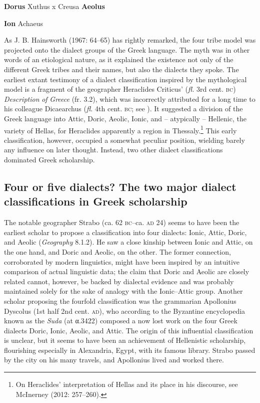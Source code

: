 \textbf{Dorus}  Xuthus x Creusa  \textbf{Aeolus}

\textbf{Ion}  Achaeus

As J. B. Hainsworth (1967: 64–65) has rightly remarked, the four tribe model was projected onto the dialect groups of the Greek language. The myth was in other words of an etiological nature, as it explained the existence not only of the different Greek tribes and their names, but also the dialects they spoke. The earliest extant testimony of a dialect classification inspired by the mythological model is a fragment of the geographer Heraclides Criticus’ (\textit{fl.} 3rd cent. \textsc{bc}) \textit{Description} \textit{of} \textit{Greece} (fr. 3.2), which was incorrectly attributed for a long time to his colleague Dicaearchus (\textit{fl.} 4th cent. \textsc{bc}; see \citealt{Brodersen2015}). It suggested a division of the Greek language into Attic, Doric, Aeolic, Ionic, and – atypically – Hellenic, the variety of Hellas, for Heraclides apparently a region in Thessaly.\footnote{On Heraclides’ interpretation of Hellas and its place in his discourse, see McInerney (2012: 257–260).} This early classification, however, occupied a somewhat peculiar position, wielding barely any influence on later thought. Instead, two other dialect classifications dominated Greek scholarship.

\subsection{Four or five dialects? The two major dialect classifications in Greek scholarship}
\hypertarget{Toc19704808}{}
The notable geographer Strabo (ca. 62 \textsc{bc–}ca. \textsc{ad} 24) seems to have been the earliest scholar to propose a classification into four dialects: Ionic, Attic, Doric, and Aeolic (\textit{Geography} 8.1.2). He saw a close kinship between Ionic and Attic, on the one hand, and Doric and Aeolic, on the other. The former connection, corroborated by modern linguistics, might have been inspired by an intuitive comparison of actual linguistic data; the claim that Doric and Aeolic are closely related cannot, however, be backed by dialectal evidence and was probably maintained solely for the sake of analogy with the Ionic–Attic group. Another scholar proposing the fourfold classification was the grammarian Apollonius Dyscolus (1st half 2nd cent. \textsc{ad}), who according to the Byzantine encyclopedia known as the \textit{Suda} (at α.3422) composed a now lost work on the four Greek dialects Doric, Ionic, Aeolic, and Attic. The origin of this influential classification is unclear, but it seems to have been an achievement of Hellenistic scholarship, flourishing especially in Alexandria, Egypt, with its famous library. Strabo passed by the city on his many travels, and Apollonius lived and worked there.


